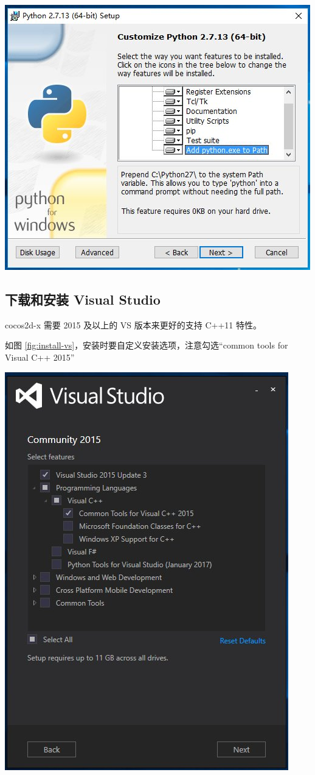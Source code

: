 \documentclass[a4paper, 10pt]{article}
\begin{document}

\begin{center}
  \includegraphics*[width=.6\textwidth]{images/install-python}
\end{center}

\subsection{下载和安装 Visual Studio}

cocos2d-x 需要 2015 及以上的 VS 版本来更好的支持 C++11 特性。

如图 \ref{fig:install-vs}，安装时要自定义安装选项，注意勾选``common
tools for Visual C++ 2015''


\begin{center}
  \includegraphics*[width=.4\textwidth]{images/install-vs}
\end{center}
\end{document}
